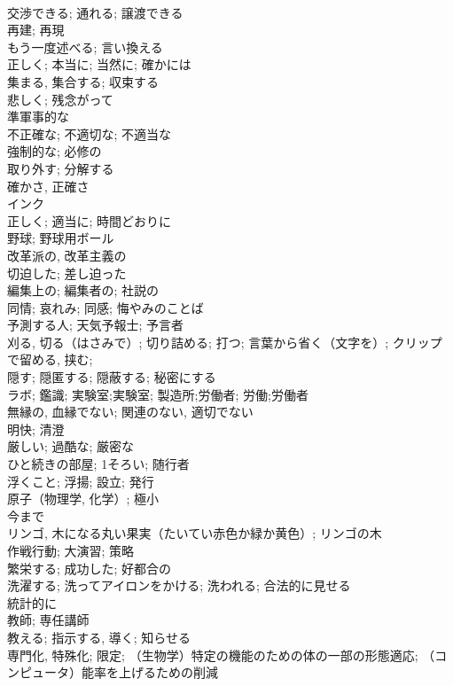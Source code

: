 \documentclass[8pt]{extreport}
\begin{document}
\begin{CJK}{UTF8}{min}
\\	交渉できる; 通れる; 譲渡できる	
\\	再建; 再現	
\\	もう一度述べる; 言い換える	
\\	正しく; 本当に; 当然に; 確かには	
\\	集まる, 集合する; 収束する	
\\	悲しく; 残念がって	
\\	準軍事的な	
\\	不正確な; 不適切な; 不適当な	
\\	強制的な; 必修の	
\\	取り外す; 分解する	
\\	確かさ, 正確さ	
\\	インク	
\\	正しく; 適当に; 時間どおりに	
\\	野球; 野球用ボール	
\\	改革派の, 改革主義の	
\\	切迫した; 差し迫った	
\\	編集上の; 編集者の; 社説の	
\\	同情; 哀れみ; 同感; 悔やみのことば	
\\	予測する人; 天気予報士; 予言者	
\\	刈る, 切る（はさみで）; 切り詰める; 打つ; 言葉から省く（文字を）; クリップで留める, 挟む;	
\\	隠す; 隠匿する; 隠蔽する; 秘密にする	
\\	ラボ; 鑑識; 実験室;実験室; 製造所;労働者; 労働;労働者	
\\	無縁の, 血縁でない; 関連のない, 適切でない	
\\	明快; 清澄	
\\	厳しい; 過酷な; 厳密な	
\\	ひと続きの部屋; 1そろい; 随行者	
\\	浮くこと; 浮揚; 設立; 発行	
\\	原子（物理学, 化学）; 極小	
\\	今まで	
\\	リンゴ, 木になる丸い果実（たいてい赤色か緑か黄色）; リンゴの木	
\\	作戦行動; 大演習; 策略	
\\	繁栄する; 成功した; 好都合の	
\\	洗濯する; 洗ってアイロンをかける; 洗われる; 合法的に見せる	
\\	統計的に	
\\	教師; 専任講師	
\\	教える; 指示する, 導く; 知らせる	
\\	専門化, 特殊化; 限定; （生物学）特定の機能のための体の一部の形態適応; （コンピュータ）能率を上げるための削減

\end{CJK}
\end{document}
